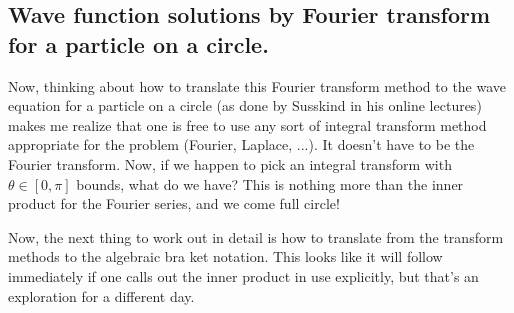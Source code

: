 %

\subsection{Wave function solutions by Fourier transform for a particle on a circle. }

Now, thinking about how to translate this Fourier transform method to the 
wave equation for a particle on a circle (as done by Susskind in his online lectures) makes me realize that one
is free to use any sort of integral transform method appropriate for the problem (Fourier, Laplace, ...).
It doesn't have to be the Fourier transform.  Now, if we happen to pick an integral transform with $\theta \in [0, \pi]$ bounds, what do we have?  This is nothing more than the inner product for the Fourier series, and we come full circle!

Now, the next thing to work out in detail is how to translate from the transform methods to the algebraic bra ket notation.  This
looks like it will follow immediately if one calls out the inner product in use explicitly, but that's an exploration for a
different day.
